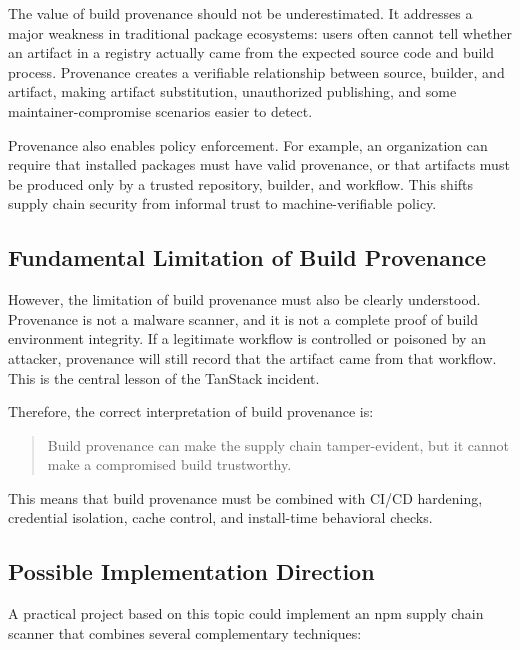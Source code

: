 \documentclass[12pt,a4paper]{article}
\begin{document}
The value of build provenance should not be underestimated. It addresses a major weakness in traditional package ecosystems: users often cannot tell whether an artifact in a registry actually came from the expected source code and build process. Provenance creates a verifiable relationship between source, builder, and artifact, making artifact substitution, unauthorized publishing, and some maintainer-compromise scenarios easier to detect.

Provenance also enables policy enforcement. For example, an organization can require that installed packages must have valid provenance, or that artifacts must be produced only by a trusted repository, builder, and workflow. This shifts supply chain security from informal trust to machine-verifiable policy.

\subsection{Fundamental Limitation of Build Provenance}

However, the limitation of build provenance must also be clearly understood. Provenance is not a malware scanner, and it is not a complete proof of build environment integrity. If a legitimate workflow is controlled or poisoned by an attacker, provenance will still record that the artifact came from that workflow. This is the central lesson of the TanStack incident.

Therefore, the correct interpretation of build provenance is:

\begin{quote}
Build provenance can make the supply chain tamper-evident, but it cannot make a compromised build trustworthy.
\end{quote}

This means that build provenance must be combined with CI/CD hardening, credential isolation, cache control, and install-time behavioral checks.

\subsection{Possible Implementation Direction}

A practical project based on this topic could implement an npm supply chain scanner that combines several complementary techniques:
\end{document}
